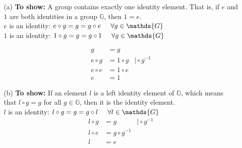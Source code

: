 \begin{itemize}
	\item [(a)]
	\textbf{To show:} A group contains exactly one identity element. That is, if \(e\) and \(1\) are both identities
	in a group \(\mathds{G}\), then \(1 = e\).\\
	\(e\) is an identity: \(e \circ g = g = g \circ e \hspace{0.5cm} \forall g \in \mathds{G}\)\\
	\(1\) is an identity: \(1 \circ g = g = g \circ 1 \hspace{0.5cm} \forall g \in \mathds{G}\)
	
	\begin{equation*}
		\begin{array}{rll}
			g &=g &\\
			e \circ g &= 1 \circ g & \vert \circ g^{-1}\\
			e \circ e &= 1 \circ e & \\
			e &= 1 &			
		\end{array}
	\end{equation*}

	\item [(b)]
	\textbf{To show:} If an element \(l\) is a left identity element of \(\mathds{G}\), which means that \(l \circ g = g\) for all \(g \in \mathds{G}\), then it is the identity element.\\
	\(l\) is an identity: \(l \circ g = g = g \circ l \hspace{0.5cm} \forall l \in \mathds{G}\)\\
	\begin{equation*}
		\begin{array}{rll}
			l \circ g &=g & \vert \circ g^{-1}\\
			l \circ e &= g \circ g^{-1} & \\
			l &= e &			
		\end{array}
	\end{equation*}


\end{itemize}
